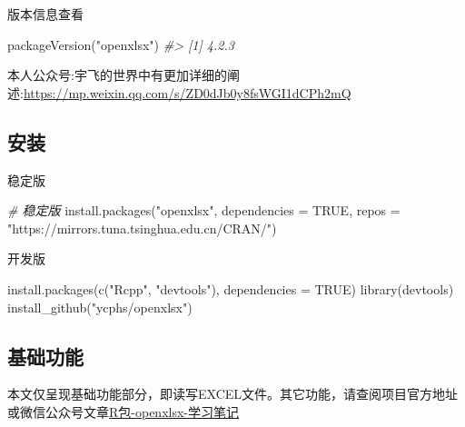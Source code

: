 \documentclass[
]{book}
\newenvironment{Shaded}{\begin{snugshade}}{\end{snugshade}}
\newcommand{\AttributeTok}[1]{\textcolor[rgb]{0.77,0.63,0.00}{#1}}
\newcommand{\CommentTok}[1]{\textcolor[rgb]{0.56,0.35,0.01}{\textit{#1}}}
\newcommand{\ConstantTok}[1]{\textcolor[rgb]{0.00,0.00,0.00}{#1}}
\newcommand{\FunctionTok}[1]{\textcolor[rgb]{0.00,0.00,0.00}{#1}}
\newcommand{\NormalTok}[1]{#1}
\newcommand{\StringTok}[1]{\textcolor[rgb]{0.31,0.60,0.02}{#1}}
\begin{document}
版本信息查看

\begin{Shaded}
\begin{Highlighting}[]
\FunctionTok{packageVersion}\NormalTok{(}\StringTok{"openxlsx"}\NormalTok{)}
\CommentTok{\#\textgreater{} [1] \textquotesingle{}4.2.3\textquotesingle{}}
\end{Highlighting}
\end{Shaded}

本人公众号:宇飞的世界中有更加详细的阐述:\url{https://mp.weixin.qq.com/s/ZD0dJb0y8fsWGI1dCPh2mQ}

\hypertarget{openxlsx:install}{%
\subsection{安装}\label{openxlsx:install}}

稳定版

\begin{Shaded}
\begin{Highlighting}[]
\CommentTok{\# 稳定版}
\FunctionTok{install.packages}\NormalTok{(}\StringTok{"openxlsx"}\NormalTok{, }\AttributeTok{dependencies =} \ConstantTok{TRUE}\NormalTok{, }\AttributeTok{repos =} \StringTok{"https://mirrors.tuna.tsinghua.edu.cn/CRAN/"}\NormalTok{)}
\end{Highlighting}
\end{Shaded}

开发版

\begin{Shaded}
\begin{Highlighting}[]
\FunctionTok{install.packages}\NormalTok{(}\FunctionTok{c}\NormalTok{(}\StringTok{"Rcpp"}\NormalTok{, }\StringTok{"devtools"}\NormalTok{), }\AttributeTok{dependencies =} \ConstantTok{TRUE}\NormalTok{)}
\FunctionTok{library}\NormalTok{(devtools)}
\FunctionTok{install\_github}\NormalTok{(}\StringTok{"ycphs/openxlsx"}\NormalTok{)}
\end{Highlighting}
\end{Shaded}

\hypertarget{openxlsx:functions}{%
\subsection{基础功能}\label{openxlsx:functions}}

本文仅呈现基础功能部分，即读写EXCEL文件。其它功能，请查阅项目官方地址或微信公众号文章\href{https://mp.weixin.qq.com/s/ZD0dJb0y8fsWGI1dCPh2mQ}{R包-openxlsx-学习笔记}
\end{document}
